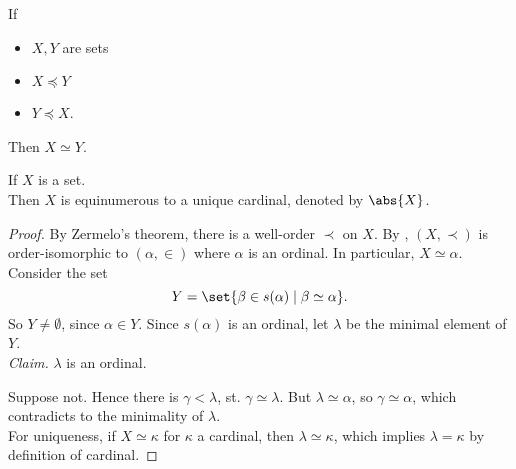 \begin{theorem}\label{thm:cantorbernstein}
    If
    \begin{itemize}
        \item $X,Y$ are sets
        \item $X \preceq Y$
        \item $Y \preceq X$.
    \end{itemize}
    Then $X \simeq Y$.
\end{theorem}

\begin{proposition}
    If $X$ is a set.\\
    Then $X$ is equinumerous to a unique cardinal, denoted by $\abs{X}$.
\end{proposition}
\begin{proof}
    By Zermelo's theorem, there is a well-order $\prec$ on $X$. By , $(X, \prec)$ is order-isomorphic to $(\alpha, \in)$
    where $\alpha$ is an ordinal. In particular, $X \simeq \alpha$.\\
    Consider the set $$ Y = \set{\beta \in s(\alpha) \mid \beta \simeq \alpha}.$$
    So $Y \ne \emptyset$, since $\alpha \in Y$. Since $s(\alpha)$ is an ordinal, let $\lambda$ be the minimal element of $Y$.\\
    \emph{Claim.} $\lambda$ is an ordinal.

    Suppose not. Hence there is $\gamma < \lambda$, st. $\gamma \simeq \lambda$. 
    But $\lambda \simeq \alpha$, so $\gamma \simeq \alpha$, which contradicts to the minimality of $\lambda$.\\
    For uniqueness, if $X \simeq \kappa$ for $\kappa$ a cardinal, then $\lambda \simeq \kappa$, which implies $\lambda = \kappa$ by definition of cardinal.
\end{proof}

